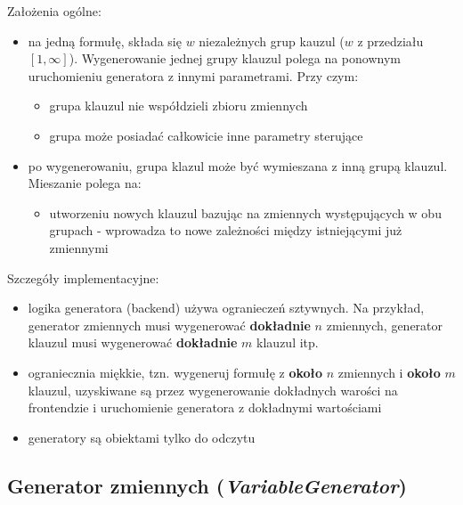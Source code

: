 \documentclass[a4paper,12pt]{article}
\begin{document}
%

\noindent
Założenia ogólne:
\begin{itemize}
  \item na jedną formułę, składa się $w$ niezależnych grup kauzul ($w$ z przedziału $[1, \infty]$). Wygenerowanie jednej grupy klauzul polega na ponownym uruchomieniu generatora z innymi parametrami. Przy czym:
    \begin{itemize}
      \item grupa klauzul nie współdzieli zbioru zmiennych
      \item grupa może posiadać całkowicie inne parametry sterujące
    \end{itemize}
  \item po wygenerowaniu, grupa klazul może być wymieszana z inną grupą klauzul. Mieszanie polega na:
    \begin{itemize}
      \item utworzeniu nowych klauzul bazując na zmiennych występujących w obu grupach - wprowadza to nowe zależności między istniejącymi już zmiennymi
    \end{itemize}
\end{itemize}

\noindent
Szczegóły implementacyjne:
\begin{itemize}
  \item logika generatora (backend) używa ogranieczeń sztywnych. Na przykład, generator zmiennych musi wygenerować \textbf{dokładnie} $n$ zmiennych, generator klauzul musi wygenerować \textbf{dokładnie} $m$ klauzul itp.
  \item ograniecznia miękkie, tzn. wygeneruj formułę z \textbf{około} $n$ zmiennych i \textbf{około} $m$ klauzul, uzyskiwane są przez wygenerowanie dokładnych warości na frontendzie i uruchomienie generatora z dokładnymi wartościami
  \item generatory są obiektami tylko do odczytu
\end{itemize}

\subsection{Generator zmiennych (\textit{VariableGenerator})}
\end{document}
